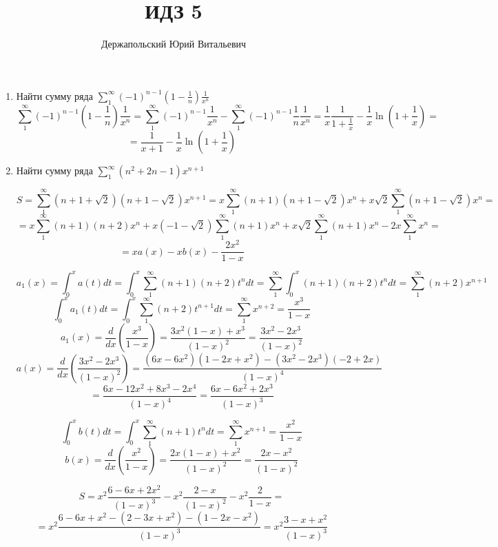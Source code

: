 \documentclass{article}
\title{ИДЗ 5}
\author{Держапольский Юрий Витальевич}
\date{}
\begin{document}
\begin{large}
\maketitle

\begin{enumerate}

\item Найти сумму ряда $\sum\limits_{1}^{\infty} (-1)^{n-1} \left( 1 - \frac{1}{n} \right) \frac{1}{x^n}$
$$\sum_{1}^{\infty} (-1)^{n-1} \left( 1 - \frac{1}{n} \right) \frac{1}{x^n} = \sum_{1}^{\infty} (-1)^{n-1} \frac{1}{x^n} - \sum_{1}^{\infty} (-1)^{n-1} \frac{1}{n} \frac{1}{x^n} = \frac{1}{x} \frac{1}{1+\frac{1}{x}} - \frac{1}{x}\ln \left(1+\frac{1}{x}\right) = $$
$$ = \frac{1}{x+1} - \frac{1}{x}\ln \left(1+\frac{1}{x}\right) $$

\item Найти сумму ряда $\sum\limits_{1}^{\infty} (n^2 + 2n - 1) x^{n+1} $

$$ S = \sum\limits_{1}^{\infty} (n + 1 + \sqrt{2})(n+1-\sqrt{2}) x^{n+1} = x \sum\limits_{1}^{\infty} (n + 1)(n+1-\sqrt{2}) x^n + x\sqrt{2}\sum\limits_{1}^{\infty} (n+1-\sqrt{2}) x^n = $$
$$ = x \sum\limits_{1}^{\infty} (n + 1)(n+2) x^n + x (-1 -\sqrt{2})\sum\limits_{1}^{\infty} (n + 1) x^n + x\sqrt{2}\sum\limits_{1}^{\infty} (n+1) x^n - 2 x\sum\limits_{1}^{\infty} x^n = $$
$$ = xa(x) - x b(x) - \frac{2x^2}{1-x}$$

$$ a_1(x) = \int_{0}^{x} a(t)dt = \int_{0}^{x} \sum\limits_{1}^{\infty} (n + 1)(n+2) t^n dt = \sum\limits_{1}^{\infty} \int_{0}^{x} (n + 1)(n+2) t^n dt = \sum\limits_{1}^{\infty} (n+2)x^{n+1} $$
$$ \int_{0}^{x} a_1(t)dt  = \int_{0}^{x} \sum\limits_{1}^{\infty} (n+2)t^{n+1} dt = \sum\limits_{1}^{\infty} x^{n+2} = \frac{x^3}{1-x}$$
$$ a_1(x) = \frac{d}{dx} \left( \frac{x^3}{1-x} \right) = \frac{3x^2(1-x) + x^3}{(1-x)^2} = \frac{3x^2-2x^3}{(1-x)^2} $$
$$ a(x) = \frac{d}{dx} \left( \frac{3x^2-2x^3}{(1-x)^2} \right) = \frac{(6x-6x^2)(1-2x+x^2) - (3x^2 - 2x^3)(-2+2x)}{(1-x)^4} $$
$$ = \frac{6x-12x^2+8x^3-2x^4}{(1-x)^4} = \frac{6x-6x^2+2x^3}{(1-x)^3} $$

$$ \int_{0}^{x} b(t) dt = \int_{0}^{x} \sum\limits_{1}^{\infty} (n + 1) t^n dt = \sum\limits_{1}^{\infty} x^{n+1} = \frac{x^2}{1-x} $$
$$ b(x) = \frac{d}{dx} \left( \frac{x^2}{1-x} \right) = \frac{2x(1-x) + x^2}{(1-x)^2} = \frac{2x-x^2}{(1-x)^2} $$

$$ S = x^2\frac{6-6x+2x^2}{(1-x)^3} - x^2\frac{2-x}{(1-x)^2} - x^2\frac{2}{1-x} = $$
$$ = x^2\frac{6-6x+x^2 - (2-3x+x^2) - (1-2x-x^2)}{(1-x)^3} = x^2\frac{3-x+x^2}{(1-x)^3}$$


\end{enumerate}
\end{large}
\end{document}
